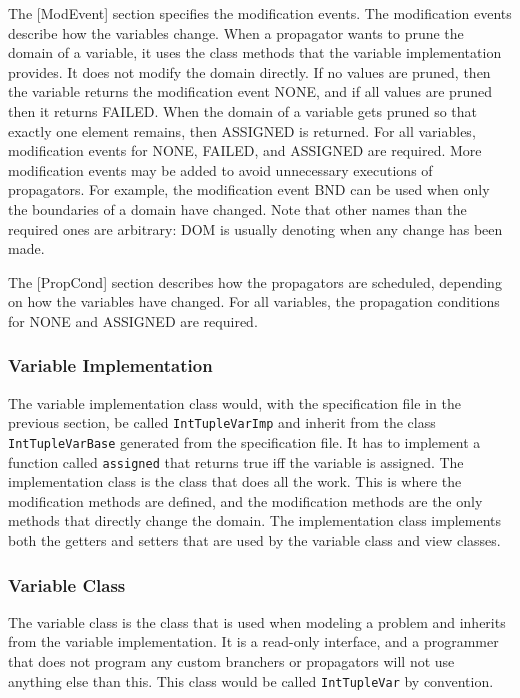 \documentclass[a4paper,11pt]{article}
\begin{document}
The [ModEvent] section specifies the modification events. The modification events describe how the variables change. When a propagator wants to prune the domain of a variable, it uses the class methods that the variable implementation provides. It does not modify the domain directly. If no values are pruned, then the variable returns the modification event NONE, and if all values are pruned then it returns FAILED. When the domain of a variable gets pruned so that exactly one element remains, then ASSIGNED is returned. For all variables, modification events for NONE, FAILED, and ASSIGNED are required. More modification events may be added to avoid unnecessary executions of propagators. For example, the modification event BND can be used when only the boundaries of a domain have changed. Note that other names than the required ones are arbitrary: DOM is usually denoting when any change has been made.

The [PropCond] section describes how the propagators are scheduled, depending on how the variables have changed. For all variables, the propagation conditions for NONE and ASSIGNED are required.

\subsubsection{Variable Implementation}
The variable implementation class would, with the specification file in the previous section, be called \texttt{IntTupleVarImp} and inherit from the class \texttt{IntTupleVarBase} generated from the specification file. It has to implement a function called \texttt{assigned} that returns true iff the variable is assigned. The implementation class is the class that does all the work. This is where the modification methods are defined, and the modification methods are the only methods that directly change the domain. The implementation class implements both the getters and setters that are used by the variable class and view classes.

\subsubsection{Variable Class}
The variable class is the class that is used when modeling a problem and inherits from the variable implementation. It is a read-only interface, and a programmer that does not program any custom branchers or propagators will not use anything else than this. This class would be called \texttt{IntTupleVar} by convention.
\end{document}
